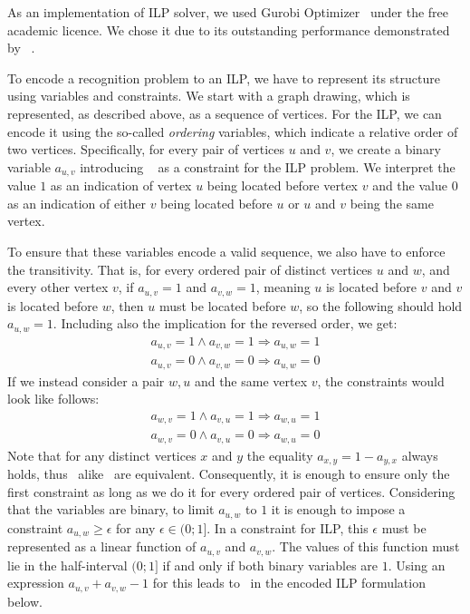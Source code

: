 As an implementation of ILP solver, we used Gurobi Optimizer~\cite{gurobi} under the free academic licence. We chose it due to its outstanding performance demonstrated by \citeauthor{Gurobi-performance}~\cite{Gurobi-performance}.

To encode a recognition problem to an ILP, we have to represent its structure using variables and constraints. We start with a graph drawing, which is represented, as described above, as a sequence of vertices. For the ILP, we can encode it using the so-called \emph{ordering} variables, which indicate a relative order of two vertices. Specifically, for every pair of vertices \(u\) and \(v\), we create a binary variable \(a_{u, v}\) introducing ~ as a constraint for the ILP problem. We interpret the value \(1\) as an indication of vertex \(u\) being located before vertex \(v\) and the value \(0\) as an indication of either \(v\) being located before \(u\) or \(u\) and \(v\) being the same vertex.

To ensure that these variables encode a valid sequence, we also have to enforce the transitivity. That is, for every ordered pair of distinct vertices \(u\) and \(w\), and every other vertex \(v\), if \(a_{u, v} = 1\) and \(a_{v, w} = 1\), meaning \(u\) is located before \(v\) and \(v\) is located before \(w\), then \(u\) must be located before \(w\), so the following should hold \(a_{u, w} = 1\). Including also the implication for the reversed order, we get:
\begin{align}
    a_{u, v} = 1 \land a_{v, w} = 1 \Longrightarrow a_{u, w} = 1 \label{eq:ilp:transitivity:uv:1}\\
    a_{u, v} = 0 \land a_{v, w} = 0 \Longrightarrow a_{u, w} = 0 \label{eq:ilp:transitivity:uv:0}
\end{align}
If we instead consider a pair \(w, u\) and the same vertex \(v\),  the constraints would look like follows:
\begin{align}
    a_{w, v} = 1 \land a_{v, u} = 1 \Longrightarrow a_{w, u} = 1 \label{eq:ilp:transitivity:vu:1} \\
    a_{w, v} = 0 \land a_{v, u} = 0 \Longrightarrow a_{w, u} = 0 \label{eq:ilp:transitivity:vu:0}
\end{align}
Note that for any distinct vertices \(x\) and \(y\) the equality \(a_{x, y} = 1 - a_{y, x}\) always holds, thus~ alike~ are equivalent. Consequently, it is enough to ensure only the first constraint as long as we do it for every ordered pair of vertices. Considering that the variables are binary, to limit \(a_{u, w}\) to \(1\) it is enough to impose a constraint \(a_{u, w} \geqslant \epsilon\) for any \(\epsilon \in (0;1]\). In a constraint for ILP, this \(\epsilon\) must be represented as a linear function of \(a_{u, v}\) and \(a_{v, w}\). The values of this function must lie in the half-interval \((0;1]\) if and only if both binary variables are \(1\). Using an expression \(a_{u, v} + a_{v, w} - 1\) for this leads to~ in the encoded ILP formulation below.

